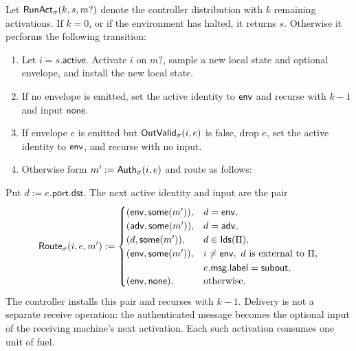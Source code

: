 \begin{definition}
\label{def:uc-run-activation}
\leanok
Let \(\mathsf{RunAct}_\sigma(k,s,m?)\) denote the controller distribution with \(k\)
remaining activations.  If \(k=0\), or if the environment has halted, it returns
\(s\).  Otherwise it performs the following transition:
\begin{enumerate}
\item Let \(i=s.\mathsf{active}\).  Activate \(i\) on \(m?\), sample a new
      local state and optional envelope, and install the new local state.
\item If no envelope is emitted, set the active identity to \(\mathsf{env}\) and recurse
      with \(k-1\) and input \(\mathsf{none}\).
\item If envelope \(e\) is emitted but \(\mathsf{OutValid}_\sigma(i,e)\) is false,
      drop \(e\), set the active identity to \(\mathsf{env}\), and recurse with no input.
\item Otherwise form \(m':=\mathsf{Auth}_\sigma(i,e)\) and route as follows:
\end{enumerate}
Put \(d:=e.\mathsf{port}.\mathsf{dst}\).  The next active identity and input are
the pair
\[
  \mathsf{Route}_\sigma(i,e,m'):=
  \begin{cases}
    (\mathsf{env},\mathsf{some}(m')), & d=\mathsf{env},\\
    (\mathsf{adv},\mathsf{some}(m')), & d=\mathsf{adv},\\
    (d,\mathsf{some}(m')), & d\in\mathsf{Ids}(\Pi),\\
    (\mathsf{env},\mathsf{some}(m')),
      &
      \begin{aligned}[t]
        &i\ne\mathsf{env},\ d\text{ is external to }\Pi,\\
        &e.\mathsf{msg}.\mathsf{label}=\mathsf{subout},
      \end{aligned}\\
    (\mathsf{env},\mathsf{none}), & \text{otherwise}.
  \end{cases}
\]
The controller installs this pair and recurses with \(k-1\).  Delivery is not a
separate receive operation: the authenticated message becomes the optional
input of the receiving machine's next activation.  Each such activation consumes
one unit of fuel.
\end{definition}

